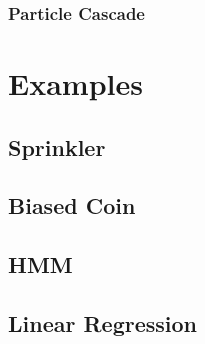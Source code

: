\subsubsection{Particle Cascade}


\section{Examples}

\subsection{Sprinkler}

\subsection{Biased Coin}

\subsection{HMM}

\subsection{Linear Regression}